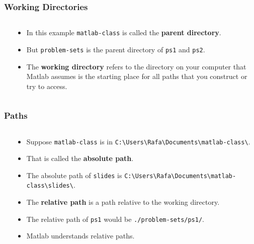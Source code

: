 \documentclass[11pt,xcolor={svgnames},aspectratio=169,usepdftitle=false,notheorems]{beamer}
\begin{document}
\begin{frame}[fragile]
    \frametitle{Working Directories}
\begin{columns}
    \begin{column}{0.2\textwidth}
    \end{column}
    \begin{column}{0.8\textwidth}
        \begin{itemize}
            \item In this example \verb;matlab-class; is called the \alert{\textbf{parent directory}}.
            \item But \verb;problem-sets; is the parent directory of \verb;ps1; and \verb;ps2;.
            \item The \alert{\textbf{working directory}} refers to the directory on your computer that Matlab assumes is the starting place for all paths that you construct or try to access.
        \end{itemize}
    \end{column}
\end{columns}
\end{frame}

\begin{frame}[fragile]
    \frametitle{Paths}
\begin{columns}
    \begin{column}{0.2\textwidth}
    \end{column}
    \begin{column}{0.8\textwidth}
        \begin{itemize}
            \item Suppose \verb;matlab-class; is in \verb;C:\Users\Rafa\Documents\matlab-class\;.
            \item That is called the \alert{\textbf{absolute path}}.
            \item The absolute path of \verb;slides; is \verb;C:\Users\Rafa\Documents\matlab-class\slides\;.
            \item The \alert{\textbf{relative path}} is a path relative to the working directory.
            \item The relative path of \verb;ps1; would be \verb;./problem-sets/ps1/;.
            \item Matlab understands relative paths.
        \end{itemize}
    \end{column}
\end{columns}
\end{frame}
\end{document}
